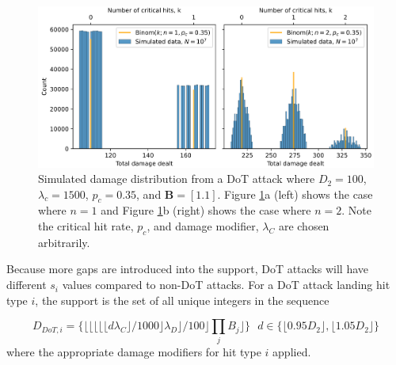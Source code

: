 \documentclass{article}
\begin{document}
        \begin{figure}[H]
            \centering
            \includegraphics[width=0.95\linewidth]{img/binom-dot-dmg-dist.PNG}
            \caption{Simulated damage distribution from a DoT attack where $D_2 = 100$, $\lambda_c = 1500$, $p_c = 0.35$, and $\textbf{B} = [1.1]$. Figure \ref{fig:CH-dot-dmg-dist}a (left) shows the case where $n=1$ and Figure \ref{fig:CH-dot-dmg-dist}b (right) shows the case where $n=2$. Note the critical hit rate, $p_c$, and damage modifier, $\lambda_C$ are chosen arbitrarily.}\label{fig:CH-dot-dmg-dist}
        \end{figure}
        
        Because more gaps are introduced into the support, DoT attacks will have different $s_i$ values compared to non-DoT attacks. For a DoT attack landing hit type $i$, the support is the set of all unique integers in the sequence

        \begin{equation}\label{eqn:dot-supp}
            D_{DoT, i} = \{ \lfloor \lfloor \lfloor \lfloor \lfloor d \lambda_C \rfloor / 1000 \rfloor \lambda_D \rfloor / 100 \rfloor \prod_{j} B_j \rfloor \}
            \:\:\: d \in \{\lfloor 0.95 D_{2}\rfloor, \lfloor 1.05 D_{2} \rfloor\}
        \end{equation}
        where the appropriate damage modifiers for hit type $i$ applied. 
\end{document}
